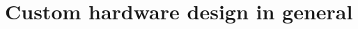 \documentclass[12pt]{report}
\begin{document}






\chapter{Custom hardware design in general}
\end{document}

